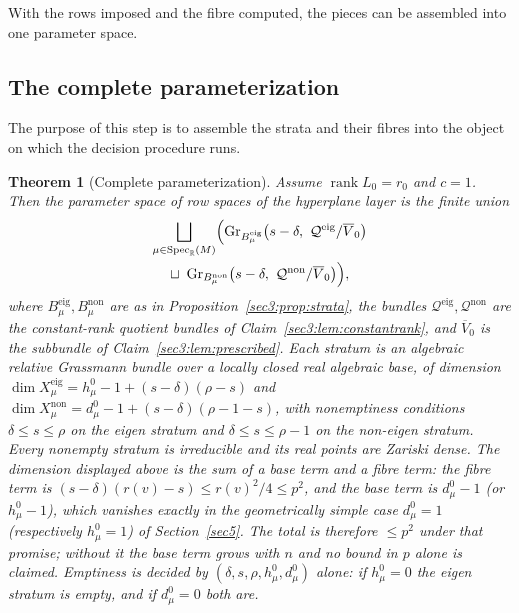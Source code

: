 \documentclass[journal]{IEEEtran}
\theoremstyle{plainn}
\newtheorem{thm}{Theorem}
\theoremstyle{remark}
\newcommand{\rank}{\operatorname{rank}}
\newcommand{\Gr}{\operatorname{Gr}}
\begin{document}
With the rows imposed and the fibre computed, the pieces can be assembled into one parameter space.


\subsection{The complete parameterization}\label{sec3:sub:param}


The purpose of this step is to assemble the strata and their fibres into the object on which the
decision procedure runs.

\begin{thm}[Complete parameterization]
\label{sec3:thm:param}
\label{sec3:rem:empty}
\label{sec3:rem:dimension}
\label{sec3:rem:realpoints}
Assume $\rank L_0=r_0$ and $c=1$. Then the parameter space of row spaces of the hyperplane layer is
the finite union
\begin{gather*}
\bigsqcup_{\mu\in\operatorname{Spec}_{\mathbb{R}}(M)}
\Bigl(
\Gr_{B_\mu^{\mathrm{eig}}}\bigl(s-\delta,\ \mathcal{Q}^{\mathrm{eig}}/\overline{V}_0\bigr)
\\
\sqcup\ \Gr_{B_\mu^{\mathrm{non}}}\bigl(s-\delta,\ \mathcal{Q}^{\mathrm{non}}/\overline{V}_0\bigr)
\Bigr),
\end{gather*}
where $B_\mu^{\mathrm{eig}},B_\mu^{\mathrm{non}}$ are as in Proposition~\ref{sec3:prop:strata}, the
bundles $\mathcal{Q}^{\mathrm{eig}},\mathcal{Q}^{\mathrm{non}}$ are the constant-rank quotient bundles
of Claim~\ref{sec3:lem:constantrank}, and $\overline{V}_0$ is the subbundle of
Claim~\ref{sec3:lem:prescribed}. Each stratum is an \emph{algebraic relative Grassmann bundle over a
locally closed real algebraic base}, of dimension
$\dim X_\mu^{\mathrm{eig}}=h_\mu^0-1+(s-\delta)(\rho-s)$ and
$\dim X_\mu^{\mathrm{non}}=d_\mu^0-1+(s-\delta)(\rho-1-s)$, with nonemptiness conditions
$\delta\le s\le\rho$ on the eigen stratum and $\delta\le s\le\rho-1$ on the non-eigen stratum. Every
nonempty stratum is irreducible and its real points are Zariski dense. The dimension displayed above is
the sum of a base term and a fibre term: the fibre term is
$(s-\delta)(r(v)-s)\le r(v)^2/4\le p^2$, and the base term is $d_\mu^0-1$ (or $h_\mu^0-1$), which
vanishes exactly in the geometrically simple case $d_\mu^0=1$
(respectively $h_\mu^0=1$) of Section~\ref{sec5}. The total is therefore $\le p^2$ under that promise;
without it the base term grows with $n$ and no bound in $p$ alone is claimed. Emptiness is decided by
$(\delta,s,\rho,h_\mu^0,d_\mu^0)$ alone: if $h_\mu^0=0$ the eigen
stratum is empty, and if $d_\mu^0=0$ both are.
\end{thm}
\end{document}
